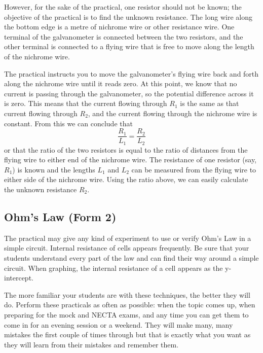 However, for the sake of the practical, one resistor should not be known; the objective of
the practical is to find the unknown resistance. The long wire along the bottom edge is a
metre of nichrome wire or other resistance wire. One terminal of the galvanometer is
connected between the two resistors, and the other terminal is connected to a flying wire
that is free to move along the length of the nichrome wire.

The practical instructs you to move the galvanometer's flying wire back and forth
along the nichrome wire until it reads zero. At this point, we know that no current is
passing through the galvanometer, so the potential difference across it is zero. This
means that the current flowing through $R_1$ is the same as that current flowing through $R_2$,
and the current flowing through the nichrome wire is constant. From this we can
conclude that
$$ \frac{R_1}{L_1} = \frac{R_2}{L_2} $$
or that the ratio of the two resistors is equal to the ratio of distances from the flying wire
to either end of the nichrome wire. The resistance of one resistor (say, $R_1$) is known and
the lengths $L_1$ and $L_2$ can be measured from the flying wire to either side of the
nichrome wire. Using the ratio above, we can easily calculate the unknown resistance $R_2$.

\subsection{Ohm’s Law (Form 2)}

The practical may give any kind of experiment to use or verify Ohm’s Law in a
simple circuit. Internal resistance of cells appears frequently. Be sure that your students
understand every part of the law and can find their way around a simple circuit. When
graphing, the internal resistance of a cell appears as the y-intercept.

The more familiar your students are with these techniques, the better they will do.
Perform these practicals as often as possible: when the topic comes up, when preparing
for the mock and NECTA exams, and any time you can get them to come in for an
evening session or a weekend. They will make many, many mistakes the first couple of
times through but that is exactly what you want as they will learn from their mistakes and
remember them.
